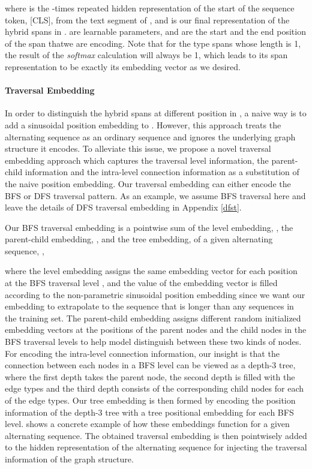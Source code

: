\documentclass[11pt,a4paper]{article}
\begin{document}
where  is the -times repeated hidden representation of the start of the sequence token, [CLS], from the text segment of , and  is our final representation of the hybrid spans in .  are learnable parameters, and  are the start and the end position of the span thatwe are encoding. Note that for the type spans whose length is 1, the result of the \emph{softmax} calculation will always be 1, which leads to its span representation to be exactly its embedding vector as we desired. 


\paragraph{Traversal Embedding}
In order to distinguish the hybrid spans at different position in , a naive way is to
add a sinusoidal position embedding \cite{tran} to . However, this approach treats the alternating sequence as an ordinary sequence and ignores the underlying graph structure it encodes. To alleviate this issue, we propose a novel traversal embedding approach which captures the traversal level information, the parent-child information and the intra-level connection information as a substitution of the naive position embedding. Our traversal embedding can either encode the BFS or DFS traversal pattern. As an example, we assume BFS traversal here and leave the details of DFS traversal embedding in Appendix \ref{dfst}.

Our BFS traversal embedding is a pointwise sum of the level embedding, , the parent-child embedding, , and the tree embedding,  of a given alternating sequence, ,

 where the level embedding assigns the same embedding vector  for each position at the BFS traversal level , and the value of the embedding vector is filled according to the non-parametric sinusoidal position embedding since we want our embedding to extrapolate to the sequence that is longer than any sequences in the training set. The parent-child embedding assigns different random initialized embedding vectors at the positions of the parent nodes and the child nodes in the BFS traversal levels to help model distinguish between these two kinds of nodes. For encoding the intra-level connection information, our insight is that the connection between each nodes in a BFS level can be viewed as a depth-3 tree, where the first depth takes the parent node, the second depth is filled with the edge types and the third depth consists of the corresponding child nodes for each of the edge types. Our tree embedding is then formed by encoding the position information of the depth-3 tree with a tree positional embedding \cite{treepos} for each BFS level.  shows a concrete example of how these embeddings function for a given alternating sequence. The obtained traversal embedding is then pointwisely added to the hidden representation of the alternating sequence  for injecting the traversal information of the graph structure.
\end{document}
